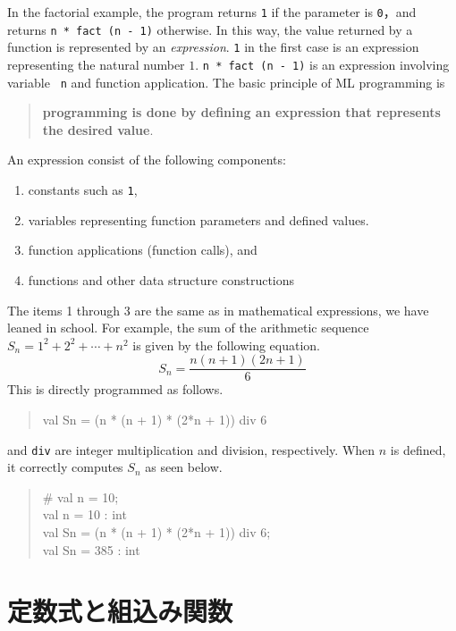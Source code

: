 \documentclass{jbook}
\newcommand{\txt}[2]{#1}
\newenvironment{program}{\begin{quote}\begin{tt}}%
                        {\end{tt}\end{quote}}
\begin{document}
\else%
	In the factorial example, the program returns {\tt 1} 
if the parameter is {\tt 0}，and returns {\tt n * fact (n - 1)}
otherwise.
	In this way, the value returned by a function is represented by
an {\em expression}.
	{\tt 1} in the first case is an expression representing the
natural number $1$.
	{\tt n * fact (n - 1)} is an expression involving variable {\tt
n} and function application.
	The basic principle of ML programming is 
\begin{quote}
{\bf programming is done by defining an expression that represents the desired value}.
\end{quote}

	An expression consist of the following components:
\begin{enumerate}
\item constants such as {\tt 1},
\item variables representing function parameters and defined values.
\item function applications (function calls), and
\item functions and other data structure constructions
\end{enumerate}
	The items 1 through 3 are the same as in mathematical expressions,
we have leaned in school.
	For example, the sum of the arithmetic sequence 
$S_n = 1^2 + 2^2 + \cdots + n^2$
is given by the following equation.
\[
S_n = \frac{n (n + 1) (2n + 1)}{6}
\]
	This is directly programmed as follows.
\begin{program}
val Sn = (n * (n + 1) * (2*n + 1)) div 6
\end{program}
	{\tt *} and {\tt div} are integer multiplication and division,
respectively.
	When $n$ is defined, it correctly computes $S_n$ as seen below.
\begin{program}
\# val n = 10;\\
val n = 10 : int\\
val Sn = (n * (n + 1) * (2*n + 1)) div 6;\\
val Sn = 385 : int
\end{program}

\fi%

\section{
\txt{定数式と組込み関数}
{Constants literals and built-in primitives}
}
\label{sec:tutorialConstants}
\end{document}
